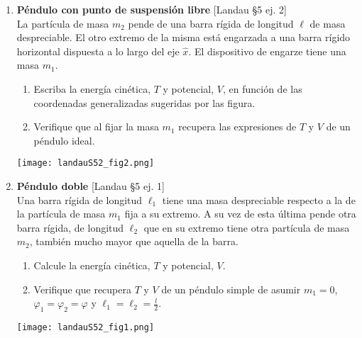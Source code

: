 \documentclass[11pt, spanish, a4paper, twoside]{article}
\begin{document}
\begin{enumerate}
\item
	\begin{minipage}[t][5cm]{0.7\textwidth}
		\textbf{Péndulo con punto de suspensión libre} [Landau \S5 ej. 2]\\
		La partícula de masa \(m_2\) pende de una barra rígida de longitud \(\ell\) de masa despreciable.
		El otro extremo de la misma está engarzada a una barra rígido horizontal dispuesta a lo largo del eje \(\hat{x}\).
		El dispositivo de engarze tiene una masa \(m_1\).
		\begin{enumerate}
			\item Escriba la energía cinética, \(T\) y potencial, \(V\), en función de las coordenadas generalizadas sugeridas por las figura.
			\item Verifique que al fijar la masa \(m_1\) recupera las expresiones de \(T\) y \(V\) de un péndulo ideal.
		\end{enumerate}
	\end{minipage}
	\begin{minipage}[c][1cm][t]{0.3\textwidth}
		\texttt{[image: landauS52\_fig2.png]}
	\end{minipage}



\item
	\begin{minipage}[t][4cm]{0.7\textwidth}
		\textbf{Péndulo doble} [Landau \S5 ej. 1]\\
		Una barra rígida de longitud \(\ell_1\) tiene una masa despreciable respecto a la de la partícula de masa \(m_1\) fija a su extremo.
		A su vez de esta última pende otra barra rígida, de longitud \(\ell_2\) que en su extremo tiene otra partícula de masa \(m_2\), también mucho mayor que aquella de la barra.
		\begin{enumerate}
			\item Calcule la energía cinética, \(T\) y potencial, \(V\).
			\item Verifique que recupera \(T\) y \(V\) de un péndulo simple de asumir \(m_1=0\), \(\varphi_1 = \varphi_2 = \varphi\) y \(\ell_1 = \ell_2 = \frac{l}{2}\).
		\end{enumerate}
	\end{minipage}
	\begin{minipage}[c][0.5cm][t]{0.3\textwidth}
		\texttt{[image: landauS52\_fig1.png]}
	\end{minipage}




\end{enumerate}
\end{document}
